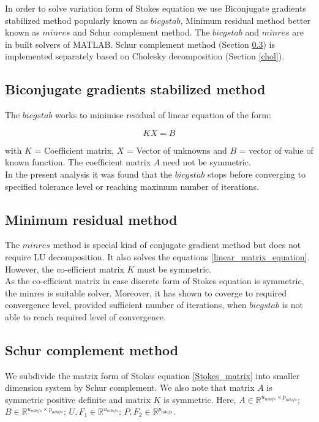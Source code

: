 \documentclass[a4paper]{book}
\begin{document}
In order to solve variation form of Stokes equation we use Biconjugate gradients stabilized method popularly known as $bicgstab$, Minimum residual method better known as $minres$ and Schur complement method. The $bicgstab$ and $minres$ are in built solvers of MATLAB. Schur complement method (Section \ref{schur}) is implemented separately based on Cholesky decomposition (Section \ref{chol}).

\subsection{Biconjugate gradients stabilized method}

The $bicgstab$ works to minimise residual of linear equation of the form:

\begin{equation} \label{linear_matrix_equation}
KX = B
\end{equation}

with $K$ = Coefficient matrix, $X$ = Vector of unknowns and $B$ = vector of value of known function. The coefficient matrix $A$ need not be symmetric. \\

In the present analysis it was found that the $bicgstab$ stops before converging to specified tolerance level or reaching maximum number of iterations. 

\subsection{Minimum residual method} 

The $minres$ method is special kind of conjugate gradient method but does not require LU decomposition. It also solves the equations \ref{linear_matrix_equation}. However, the co-efficient matrix $K$ must be symmetric. \\

As the co-efficient matrix in case discrete form of Stokes equation is symmetric, the minres is suitable solver. Moreover, it has shown to coverge to required convergence level, provided sufficient number of iterations, when $bicgstab$ is not able to reach required level of convergence.

\subsection{Schur complement method} \label{schur}

We subdivide the matrix form of Stokes equation \eqref{Stokes_matrix} into smaller dimension system by Schur complement. We also note that matrix $A$ is symmetric positive definite and matrix $K$ is symmetric.
Here, $A \in \mathbb{R}^{u_{ndofs} \times p_{ndofs}}$; $B \in \mathbb{R}^{u_{ndofs} \times p_{ndofs}}$; $U,F_1 \in \mathbb{R}^{u_{ndofs}}$; $P, F_2 \in \mathbb{R}^{p_{ndofs}}$. \\
\end{document}
